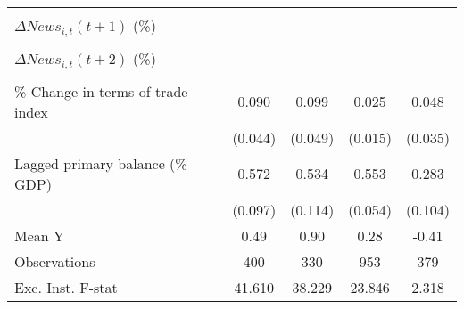 {\begin{tabular}{l*{4}{c}}
                    &                     &                     &                     &                     \\
\addlinespace
$ \Delta News_{i,t}(t+1)$ (\%)&                     &                     &                     &                     \\
                    &                     &                     &                     &                     \\
\addlinespace
$ \Delta News_{i,t}(t+2)$ (\%)&                     &                     &                     &                     \\
                    &                     &                     &                     &                     \\
\addlinespace
\% Change in terms-of-trade index&       0.090\sym{**} &       0.099\sym{**} &       0.025\sym{*}  &       0.048         \\
                    &     (0.044)         &     (0.049)         &     (0.015)         &     (0.035)         \\
\addlinespace
Lagged primary balance (\% GDP)&       0.572\sym{***}&       0.534\sym{***}&       0.553\sym{***}&       0.283\sym{***}\\
                    &     (0.097)         &     (0.114)         &     (0.054)         &     (0.104)         \\
\midrule
Mean Y              &        0.49         &        0.90         &        0.28         &       -0.41         \\
Observations        &         400         &         330         &         953         &         379         \\
Exc. Inst. F-stat   &      41.610         &      38.229         &      23.846         &       2.318         \\
\bottomrule
\end{tabular}
}
